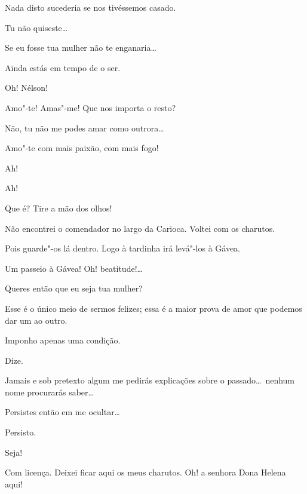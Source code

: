 {  
Nada disto sucederia se nos tivéssemos casado.

  Tu não quiseste\ldots

  Se eu fosse tua mulher não te enganaria\ldots

  Ainda estás em tempo de o ser.

  Oh! Nélson!

  Amo"-te! Amas"-me! Que nos importa o resto?

  Não, tu não me podes amar como outrora\ldots

  Amo"-te com mais paixão, com mais fogo!


  Ah!

  Ah!

  Que é? Tire
a mão dos olhos!

  Não encontrei o comendador no largo da Carioca. Voltei
com os charutos.

  Pois guarde"-os lá dentro. Logo à tardinha irá
levá"-los à Gávea.

   Um passeio à Gávea! Oh! beatitude!\ldots\ 

  Queres então que eu seja tua mulher?

  Esse é o único meio de sermos felizes; essa é
a maior prova de amor que podemos dar um ao outro.

  Imponho apenas uma condição.

  Dize.

  Jamais e sob pretexto algum me pedirás
explicações sobre o passado\ldots\ nenhum nome procurarás saber\ldots

  Persistes então em me ocultar\ldots

  Persisto.

  Seja!


   Com licença. Deixei
ficar aqui os meus charutos.  Oh! a
senhora Dona Helena aqui!

}
